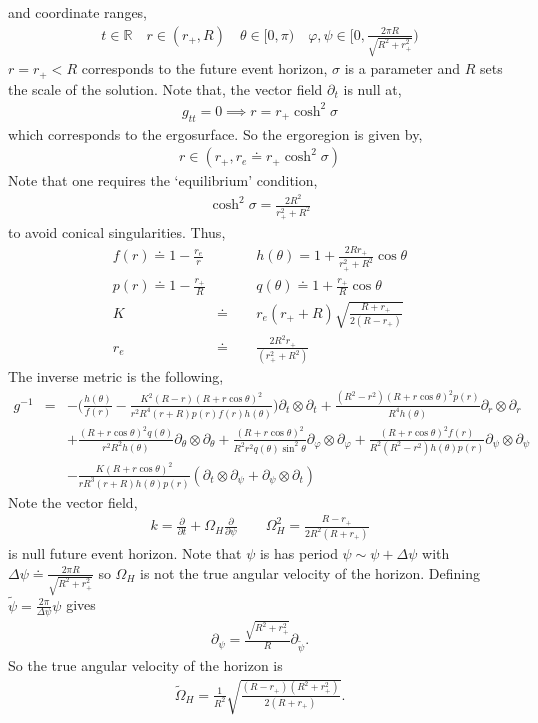 \documentclass[11pt]{article}
\renewcommand{\phi}{\varphi}
\begin{document}
 and coordinate ranges, 
 \begin{eqnarray}
 t\in \mathbb{R}\quad r\in (r_+,R)\quad \theta\in [0,\pi)\quad \phi,\psi\in \Big[0,\frac{2\pi R}{\sqrt{R^2+r_+^2}}\Big)
 \end{eqnarray}
 $r=r_+<R$ corresponds to the future event horizon, $\sigma$ is a parameter and $R$ sets the scale of the solution. Note that, the vector field $\partial_t$ is null at,
 \begin{eqnarray}
 g_{tt}=0\implies r=r_+\cosh^2\sigma
 \end{eqnarray}
 which corresponds to the ergosurface. So the ergoregion is given by, 
 \begin{eqnarray}
 r\in (r_+,r_e\doteq r_+\cosh^2\sigma)
 \end{eqnarray}
 Note that one requires the `equilibrium' condition, 
 \begin{eqnarray}
 \cosh^2\sigma=\frac{2R^2}{r_+^2+R^2}
 \end{eqnarray}
 to avoid conical singularities. Thus, 
 \begin{eqnarray}
 f(r)\doteq1-\frac{r_e}{r}&\qquad& h(\theta)=1+\frac{2Rr_+}{r_+^2+R^2}\cos\theta\\
 p(r)\doteq1-\frac{r_+}{R}&\qquad& q(\theta)\doteq1+\frac{r_+}{R}\cos\theta\\
 K&\doteq&r_e(r_++R)\sqrt{\frac{R+r_+}{2(R-r_+)}}\\
 r_e&\doteq&\frac{2R^2r_+}{(r_+^2+R^2)}
 \end{eqnarray}
 The inverse metric is the following, 
 \begin{eqnarray}
 g^{-1}&=&-\Big(\frac{h(\theta)}{f(r)}-\frac{K^2(R-r)(R+r\cos\theta)^2}{r^2R^4(r+R)p(r)f(r)h(\theta)}\Big)\partial_t\otimes\partial_t+\frac{(R^2-r^2)(R+r\cos\theta)^2p(r)}{R^4h(\theta)}\partial_r\otimes\partial_r\\
 &&+\frac{(R+r\cos\theta)^2q(\theta)}{r^2R^2h(\theta)}\partial_{\theta}\otimes\partial_{\theta}+\frac{(R+r\cos\theta)^2}{R^2r^2q(\theta)\sin^2\theta}\partial_{\phi}\otimes\partial_{\phi}+\frac{(R+r\cos\theta)^2f(r)}{R^2(R^2-r^2)h(\theta)p(r)}\partial_{\psi}\otimes\partial_{\psi}\nonumber\\
 &&-\frac{K(R+r\cos\theta)^2}{rR^3(r+R)h(\theta)p(r)}(\partial_{t}\otimes\partial_{\psi}+\partial_{\psi}\otimes\partial_t)\nonumber
 \end{eqnarray}
 Note the vector field, 
 \begin{eqnarray}
 k=\frac{\partial}{\partial t}+\Omega_H\frac{\partial}{\partial\psi} \qquad \Omega_H^2=\frac{R-r_+}{2R^2(R+r_+)}
 \end{eqnarray}
is null future event horizon. Note that $\psi$ is has period $\psi\sim \psi+\Delta\psi$ with $\Delta\psi\doteq\frac{2\pi R}{\sqrt{R^2+r_+^2}}$ so $\Omega_H$ is not the true angular velocity of the horizon. Defining $\tilde{\psi}=\frac{2\pi}{\Delta\psi}\psi$ gives
\begin{align}
\partial_{\psi}=\frac{\sqrt{R^2+r_+^2}}{R}\partial_{\tilde{\psi}}. 
\end{align}
So the true angular velocity of the horizon is
\begin{align}
\tilde{\Omega}_H=\frac{1}{R^2}\sqrt{\frac{(R-r_+)(R^2+r_+^2)}{2(R+r_+)}}.
\end{align}
\end{document}
